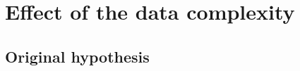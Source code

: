             
            
            
            
    \section{Effect of the data complexity}
        \subsection{Original hypothesis}
        
